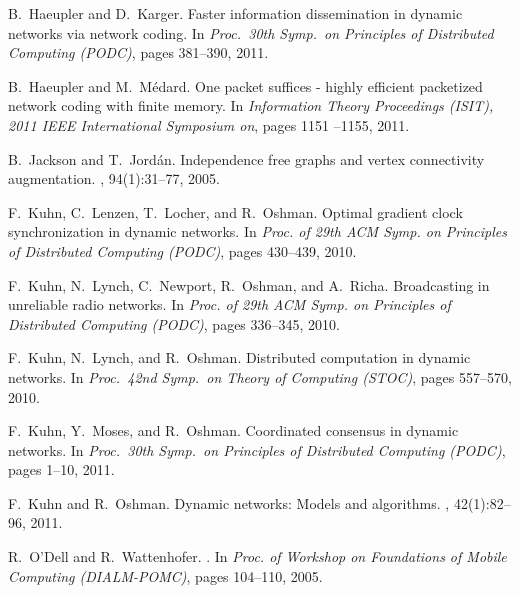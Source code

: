 \documentclass{llncs}
\begin{document}
\begin{thebibliography}{10}
B.~Haeupler and D.~Karger.
\newblock Faster information dissemination in dynamic networks via network
  coding.
\newblock In {\em Proc.\ 30th Symp.\ on Principles of Distributed Computing
  (PODC)}, pages 381--390, 2011.

B.~Haeupler and M.~M{\'e}dard.
\newblock One packet suffices - highly efficient packetized network coding with
  finite memory.
\newblock In {\em Information Theory Proceedings (ISIT), 2011 IEEE
  International Symposium on}, pages 1151 --1155, 2011.

B.~Jackson and T.~Jord{\'a}n.
\newblock Independence free graphs and vertex connectivity augmentation.
, 94(1):31--77, 2005.

F.~Kuhn, C.~Lenzen, T.~Locher, and R.~Oshman.
\newblock Optimal gradient clock synchronization in dynamic networks.
\newblock In {\em Proc. of 29th ACM Symp. on Principles of Distributed
  Computing (PODC)}, pages 430--439, 2010.

F.~Kuhn, N.~Lynch, C.~Newport, R.~Oshman, and A.~Richa.
\newblock Broadcasting in unreliable radio networks.
\newblock In {\em Proc. of 29th ACM Symp. on Principles of Distributed
  Computing (PODC)}, pages 336--345, 2010.

F.~Kuhn, N.~Lynch, and R.~Oshman.
\newblock Distributed computation in dynamic networks.
\newblock In {\em Proc.\ 42nd Symp.\ on Theory of Computing (STOC)}, pages
  557--570, 2010.

F.~Kuhn, Y.~Moses, and R.~Oshman.
\newblock Coordinated consensus in dynamic networks.
\newblock In {\em Proc.\ 30th Symp.\ on Principles of Distributed Computing
  (PODC)}, pages 1--10, 2011.

F.~Kuhn and R.~Oshman.
\newblock Dynamic networks: Models and algorithms.
, 42(1):82--96, 2011.

R.~O'Dell and R.~Wattenhofer.
.
\newblock In {\em Proc. of Workshop on Foundations of Mobile Computing
  (DIALM-POMC)}, pages 104--110, 2005.

\end{thebibliography}
\end{document}
